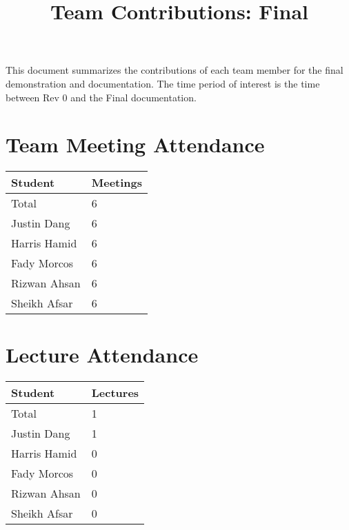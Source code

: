 \documentclass{article}
\title{Team Contributions: Final\\\progname}
\author{\authname}
\date{}
\begin{document}
\maketitle

This document summarizes the contributions of each team member for the final
demonstration and documentation.  The time period of interest is the time
between Rev 0 and the Final documentation.

\section{Team Meeting Attendance}


\begin{table}[H]
\centering
\begin{tabular}{ll}
\toprule
\textbf{Student} & \textbf{Meetings}\\
\midrule
Total & 6\\
Justin Dang & 6\\
Harris Hamid & 6\\
Fady Morcos & 6\\
Rizwan Ahsan & 6\\
Sheikh Afsar & 6\\
\bottomrule
\end{tabular}
\end{table}


\section{Lecture Attendance}


\begin{table}[H]
\centering
\begin{tabular}{ll}
\toprule
\textbf{Student} & \textbf{Lectures}\\
\midrule
Total & 1\\
Justin Dang & 1\\
Harris Hamid & 0\\
Fady Morcos & 0\\
Rizwan Ahsan & 0\\
Sheikh Afsar & 0\\
\bottomrule
\end{tabular}
\end{table}
\end{document}
